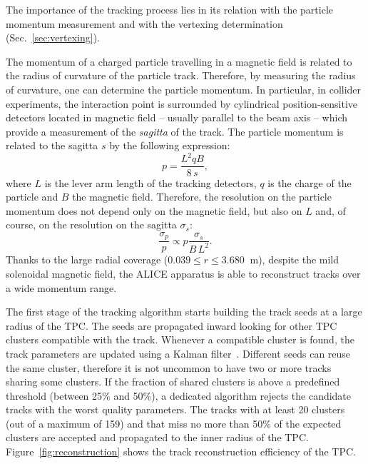 The importance of the tracking process lies in its relation with the particle momentum
measurement and with the vertexing determination (Sec.~\ref{sec:vertexing}).

The momentum of a charged particle travelling in a magnetic field is related to the radius of curvature
of the particle track. Therefore, by measuring the radius of curvature, one can determine the
particle momentum.
In particular, in collider experiments, the interaction point is surrounded by cylindrical 
position-sensitive detectors located in magnetic field -- usually parallel to the beam axis -- 
which provide a measurement of the \textit{sagitta} of the track.
The particle momentum is related to the sagitta $s$ by the following expression:
\begin{equation}
    p = \frac{L^{2} q B}{8\,s},
\end{equation}
where $L$ is the lever arm length of the tracking detectors, $q$ is the charge of the particle and $B$
the magnetic field.
Therefore, the resolution on the particle momentum does not depend only on the magnetic field,
but also on $L$ and, of course, on the resolution on the sagitta $\sigma_{s}$:
\begin{equation}
    \frac{\sigma_{p}}{p} \propto p \frac{\sigma_{s}}{B\,L^{2}}.
\end{equation}
Thanks to the large radial coverage ($0.039 \leq r \leq 3.680\ $ m), despite the mild solenoidal
magnetic field, the ALICE apparatus is able to reconstruct tracks over a wide momentum range.

The first stage of the tracking algorithm starts building the track seeds at a large radius of 
the TPC.
The seeds are propagated inward looking for other TPC clusters compatible with the track.
Whenever a compatible cluster is found, the track parameters are updated using a Kalman 
filter~\cite{kalman}. 
Different seeds can reuse the same cluster, therefore it is not uncommon to have two or more
tracks sharing some clusters. 
If the fraction of shared clusters is above a predefined threshold (between 25\% and 50\%), a
dedicated algorithm rejects the candidate tracks with the worst quality parameters.
The tracks with at least 20 clusters (out of a maximum of 159) and that miss no more than 50\% 
of the expected clusters are accepted and propagated to the inner radius of the TPC.
Figure~\ref{fig:reconstruction} shows the track reconstruction efficiency of the TPC.

